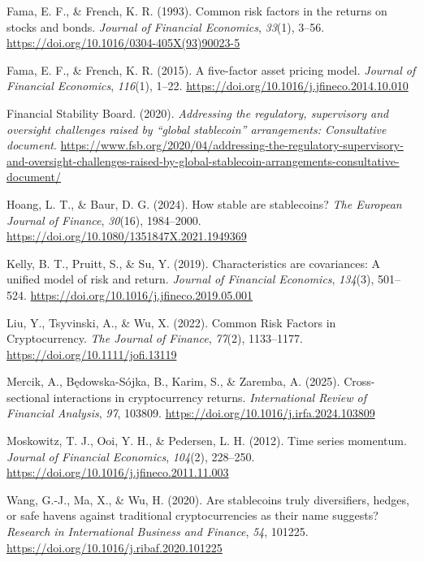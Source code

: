 \documentclass[
  11pt,
  a4paper,
  openany]{scrreprt}
\newlength{\cslhangindent}
\newenvironment{CSLReferences}[2] %
 {\begin{list}{}{%
  \setlength{\itemindent}{0pt}
  \setlength{\leftmargin}{0pt}
  \setlength{\parsep}{0pt}
  \ifodd #1
   \setlength{\leftmargin}{\cslhangindent}
   \setlength{\itemindent}{-1\cslhangindent}
  \fi
  \setlength{\itemsep}{#2\baselineskip}}}
 {\end{list}}
\begin{document}
\begin{CSLReferences}{1}{0}
Fama, E. F., \& French, K. R. (1993). Common risk factors in the returns
on stocks and bonds. \emph{Journal of Financial Economics},
\emph{33}(1), 3--56. \url{https://doi.org/10.1016/0304-405X(93)90023-5}

Fama, E. F., \& French, K. R. (2015). A five-factor asset pricing model.
\emph{Journal of Financial Economics}, \emph{116}(1), 1--22.
\url{https://doi.org/10.1016/j.jfineco.2014.10.010}

Financial Stability Board. (2020). \emph{Addressing the regulatory,
supervisory and oversight challenges raised by {``global stablecoin''}
arrangements: Consultative document}.
\url{https://www.fsb.org/2020/04/addressing-the-regulatory-supervisory-and-oversight-challenges-raised-by-global-stablecoin-arrangements-consultative-document/}

Hoang, L. T., \& Baur, D. G. (2024). How stable are stablecoins?
\emph{The European Journal of Finance}, \emph{30}(16), 1984--2000.
\url{https://doi.org/10.1080/1351847X.2021.1949369}

Kelly, B. T., Pruitt, S., \& Su, Y. (2019). Characteristics are
covariances: A unified model of risk and return. \emph{Journal of
Financial Economics}, \emph{134}(3), 501--524.
\url{https://doi.org/10.1016/j.jfineco.2019.05.001}

Liu, Y., Tsyvinski, A., \& Wu, X. (2022). Common Risk Factors in
Cryptocurrency. \emph{The Journal of Finance}, \emph{77}(2), 1133--1177.
\url{https://doi.org/10.1111/jofi.13119}

Mercik, A., Będowska-Sójka, B., Karim, S., \& Zaremba, A. (2025).
Cross-sectional interactions in cryptocurrency returns.
\emph{International Review of Financial Analysis}, \emph{97}, 103809.
\url{https://doi.org/10.1016/j.irfa.2024.103809}

Moskowitz, T. J., Ooi, Y. H., \& Pedersen, L. H. (2012). Time series
momentum. \emph{Journal of Financial Economics}, \emph{104}(2),
228--250. \url{https://doi.org/10.1016/j.jfineco.2011.11.003}

Wang, G.-J., Ma, X., \& Wu, H. (2020). Are stablecoins truly
diversifiers, hedges, or safe havens against traditional
cryptocurrencies as their name suggests? \emph{Research in International
Business and Finance}, \emph{54}, 101225.
\url{https://doi.org/10.1016/j.ribaf.2020.101225}

\end{CSLReferences}
\end{document}
